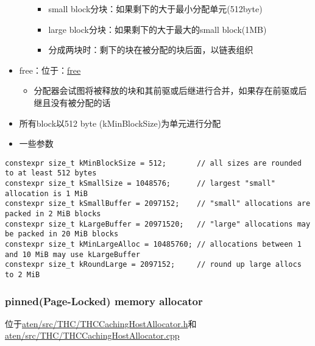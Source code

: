 \begin{itemize}
\begin{itemize}
    \begin{itemize}
    \tightlist
    \item
      small block分块：如果剩下的大于最小分配单元(512byte)
    \item
      large block分块：如果剩下的大于最大的small block(1MB)
    \item
      分成两块时：剩下的块在被分配的块后面，以链表组织
    \end{itemize}
  \end{itemize}
\item
  free：位于：\href{https://github.com/pytorch/pytorch/blob/master/c10/cuda/CUDACachingAllocator.cpp\#L303}{free}

  \begin{itemize}
  \tightlist
  \item
    分配器会试图将被释放的块和其前驱或后继进行合并，如果存在前驱或后继且没有被分配的话
  \end{itemize}
\item
  所有block以512 byte (kMinBlockSize)为单元进行分配
\item
  一些参数
\end{itemize}

\begin{lstlisting}
constexpr size_t kMinBlockSize = 512;       // all sizes are rounded to at least 512 bytes
constexpr size_t kSmallSize = 1048576;      // largest "small" allocation is 1 MiB
constexpr size_t kSmallBuffer = 2097152;    // "small" allocations are packed in 2 MiB blocks
constexpr size_t kLargeBuffer = 20971520;   // "large" allocations may be packed in 20 MiB blocks
constexpr size_t kMinLargeAlloc = 10485760; // allocations between 1 and 10 MiB may use kLargeBuffer
constexpr size_t kRoundLarge = 2097152;     // round up large allocs to 2 MiB
\end{lstlisting}

\subsubsection{pinned(Page-Locked) memory allocator}

位于\href{https://github.com/pytorch/pytorch/blob/master/aten/src/THC/THCCachingHostAllocator.h}{aten/src/THC/THCCachingHostAllocator.h}和\href{https://github.com/pytorch/pytorch/blob/master/aten/src/THC/THCCachingHostAllocator.cpp}{aten/src/THC/THCCachingHostAllocator.cpp}

